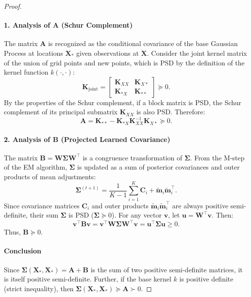 \documentclass{article}
\begin{document}
\begin{proof}
\paragraph{1. Analysis of $\mathbf{A}$ (Schur Complement)}
The matrix $\mathbf{A}$ is recognized as the conditional covariance of the base Gaussian Process at locations $\mathbf{X}_*$ given observations at $\mathbf{X}$. Consider the joint kernel matrix of the union of grid points and new points, which is PSD by the definition of the kernel function $k(\cdot, \cdot)$:
\begin{equation}
    \nonumber
    \mathbf{K}_{\text{joint}} = \begin{bmatrix} \mathbf{K}_{XX} & \mathbf{K}_{X*} \\ \mathbf{K}_{*X} & \mathbf{K}_{**} \end{bmatrix} \succeq 0.
\end{equation}
By the properties of the Schur complement, if a block matrix is PSD, the Schur complement of its principal submatrix $\mathbf{K}_{XX}$ is also PSD. Therefore:
\begin{equation}
    \nonumber
    \mathbf{A} = \mathbf{K}_{**} - \mathbf{K}_{*X} \mathbf{K}_{XX}^{-1} \mathbf{K}_{X*} \succeq 0.
\end{equation}

\paragraph{2. Analysis of $\mathbf{B}$ (Projected Learned Covariance)}
The matrix $\mathbf{B} = \mathbf{W} \boldsymbol{\Sigma} \mathbf{W}^\top$ is a congruence transformation of $\boldsymbol{\Sigma}$.
From the M-step of the EM algorithm, $\boldsymbol{\Sigma}$ is updated as a sum of posterior covariances and outer products of mean adjustments:
\begin{equation}
    \nonumber
    \boldsymbol{\Sigma}^{(t+1)} = \frac{1}{K-1} \sum_{i=1}^{K} \mathbf{C}_i + \mathbf{\tilde m}_i \mathbf{\tilde m}_i^{\top}.
\end{equation}
Since covariance matrices $\mathbf{C}_i$ and outer products $\mathbf{\tilde m}_i \mathbf{\tilde m}_i^{\top}$ are always positive semi-definite, their sum $\boldsymbol{\Sigma}$ is PSD ($\boldsymbol{\Sigma} \succeq 0$).
For any vector $\mathbf{v}$, let $\mathbf{u} = \mathbf{W}^\top \mathbf{v}$. Then:
\begin{equation}
    \nonumber
    \mathbf{v}^\top \mathbf{B} \mathbf{v} = \mathbf{v}^\top \mathbf{W} \boldsymbol{\Sigma} \mathbf{W}^\top \mathbf{v} = \mathbf{u}^\top \boldsymbol{\Sigma} \mathbf{u} \geq 0.
\end{equation}
Thus, $\mathbf{B} \succeq 0$.

\paragraph{Conclusion}
Since $\boldsymbol{\Sigma}(\mathbf{X}_*, \mathbf{X}_*) = \mathbf{A} + \mathbf{B}$ is the sum of two positive semi-definite matrices, it is itself positive semi-definite.
Further, if the base kernel $k$ is positive definite (strict inequality),
then $\boldsymbol{\Sigma}(\mathbf{X}_*, \mathbf{X}_*) \succeq \mathbf{A} \succ 0$.
\end{proof}
\end{document}
